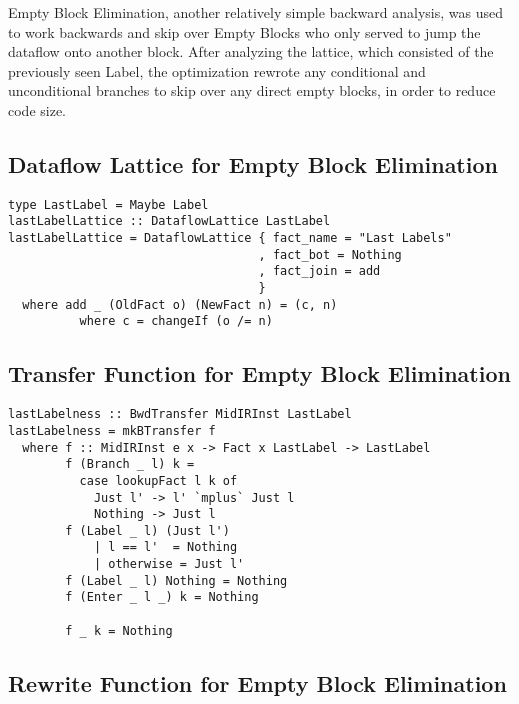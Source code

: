 \documentclass[11pt]{article}
\begin{document}
Empty Block Elimination, another relatively simple backward analysis, was used to work backwards and skip over Empty Blocks who only served to jump the dataflow onto another block. After analyzing the lattice, which consisted of the previously seen Label, the optimization rewrote any conditional and unconditional branches to skip over any direct empty blocks, in order to reduce code size.

\subsection{Dataflow Lattice for Empty Block Elimination}

\begin{verbatim}
type LastLabel = Maybe Label
lastLabelLattice :: DataflowLattice LastLabel
lastLabelLattice = DataflowLattice { fact_name = "Last Labels"
                                   , fact_bot = Nothing
                                   , fact_join = add
                                   }
  where add _ (OldFact o) (NewFact n) = (c, n)
          where c = changeIf (o /= n)
\end{verbatim}

\subsection{Transfer Function for Empty Block Elimination}
\begin{verbatim}
lastLabelness :: BwdTransfer MidIRInst LastLabel
lastLabelness = mkBTransfer f
  where f :: MidIRInst e x -> Fact x LastLabel -> LastLabel
        f (Branch _ l) k = 
          case lookupFact l k of
            Just l' -> l' `mplus` Just l
            Nothing -> Just l
        f (Label _ l) (Just l')
            | l == l'  = Nothing
            | otherwise = Just l'
        f (Label _ l) Nothing = Nothing
        f (Enter _ l _) k = Nothing
        
        f _ k = Nothing
\end{verbatim}


\subsection{Rewrite Function for Empty Block Elimination}
\end{document}
